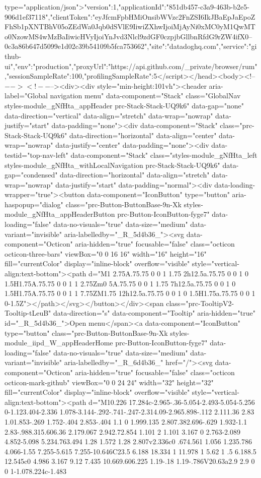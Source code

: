 type="application/json">{"version":1,"applicationId":"851db457-c3a9-463b-b2e5-906d1ef37118","clientToken":"eyJfcmFpbHMiOnsibWVzc2FnZSI6IkJBaEpJaEpoZFhSb1pXNTBhV05oZEdWa0Jqb0dSVlE9IiwiZXhwIjoiMjAyNi0xMC0yM1QwMTo0NzowMS4wMzBaIiwicHVyIjoiYnJvd3Nlcl9zdGF0czpjbGllbnRfdG9rZW4ifX0--0c3a86b647d5099e1d02c39b54109b5fca753662","site":"datadoghq.com","service":"github-ui","env":"production","proxyUrl":"https://api.github.com/_private/browser/rum","sessionSampleRate":100,"profilingSampleRate":5}</script></head><body><!--$--><!--$--><div><div style="min-height:101vh"><header aria-label="Global navigation menu" data-component="Stack" class="GlobalNav styles-module_gNfHta_appHeader prc-Stack-Stack-UQ9k6" data-gap="none" data-direction="vertical" data-align="stretch" data-wrap="nowrap" data-justify="start" data-padding="none"><div data-component="Stack" class="prc-Stack-Stack-UQ9k6" data-direction="horizontal" data-align="center" data-wrap="nowrap" data-justify="center" data-padding="none"><div data-testid="top-nav-left" data-component="Stack" class="styles-module_gNfHta_left styles-module_gNfHta_withLocalNavigation prc-Stack-Stack-UQ9k6" data-gap="condensed" data-direction="horizontal" data-align="stretch" data-wrap="nowrap" data-justify="start" data-padding="normal"><div data-loading-wrapper="true"><button data-component="IconButton" type="button" aria-haspopup="dialog" class="prc-Button-ButtonBase-9n-Xk styles-module_gNfHta_appHeaderButton prc-Button-IconButton-fyge7" data-loading="false" data-no-visuals="true" data-size="medium" data-variant="invisible" aria-labelledby="_R_5d4b36_"><svg data-component="Octicon" aria-hidden="true" focusable="false" class="octicon octicon-three-bars" viewBox="0 0 16 16" width="16" height="16" fill="currentColor" display="inline-block" overflow="visible" style="vertical-align:text-bottom"><path d="M1 2.75A.75.75 0 0 1 1.75 2h12.5a.75.75 0 0 1 0 1.5H1.75A.75.75 0 0 1 1 2.75Zm0 5A.75.75 0 0 1 1.75 7h12.5a.75.75 0 0 1 0 1.5H1.75A.75.75 0 0 1 1 7.75ZM1.75 12h12.5a.75.75 0 0 1 0 1.5H1.75a.75.75 0 0 1 0-1.5Z"></path></svg></button></div><span class="prc-TooltipV2-Tooltip-tLeuB" data-direction="s" data-component="Tooltip" aria-hidden="true" id="_R_5d4b36_">Open menu</span><a data-component="IconButton" type="button" class="prc-Button-ButtonBase-9n-Xk styles-module_iipd_W_appHeaderHome prc-Button-IconButton-fyge7" data-loading="false" data-no-visuals="true" data-size="medium" data-variant="invisible" aria-labelledby="_R_6d4b36_" href="/"><svg data-component="Octicon" aria-hidden="true" focusable="false" class="octicon octicon-mark-github" viewBox="0 0 24 24" width="32" height="32" fill="currentColor" display="inline-block" overflow="visible" style="vertical-align:text-bottom"><path d="M10.226 17.284c-2.965-.36-5.054-2.493-5.054-5.256 0-1.123.404-2.336 1.078-3.144-.292-.741-.247-2.314.09-2.965.898-.112 2.111.36 2.83 1.01.853-.269 1.752-.404 2.853-.404 1.1 0 1.999.135 2.807.382.696-.629 1.932-1.1 2.83-.988.315.606.36 2.179.067 2.942.72.854 1.101 2 1.101 3.167 0 2.763-2.089 4.852-5.098 5.234.763.494 1.28 1.572 1.28 2.807v2.336c0 .674.561 1.056 1.235.786 4.066-1.55 7.255-5.615 7.255-10.646C23.5 6.188 18.334 1 11.978 1 5.62 1 .5 6.188.5 12.545c0 4.986 3.167 9.12 7.435 10.669.606.225 1.19-.18 1.19-.786V20.63a2.9 2.9 0 0 1-1.078.224c-1.483 